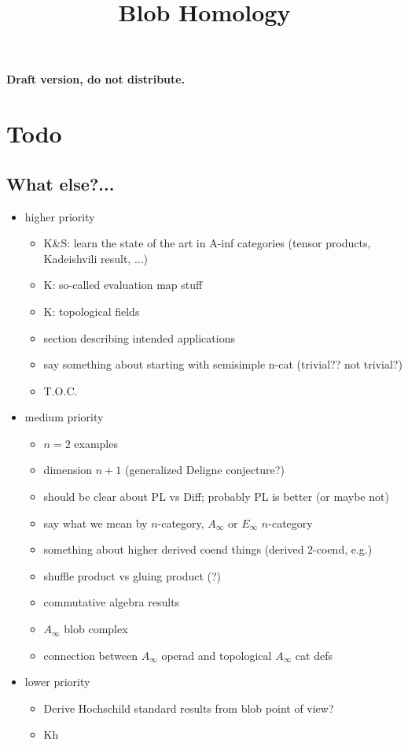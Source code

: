 \documentclass[11pt,leqno]{amsart}
\title{Blob Homology}
\begin{document}
\makeatletter
{}
\gdef\theequation{\thesection.\arabic{equation}}
\makeatother


\maketitle

\textbf{Draft version, do not distribute.}

\versioninfo

\section*{Todo}

\subsection*{What else?...}

\begin{itemize}
\item higher priority
\begin{itemize}
\item K\&S: learn the state of the art in A-inf categories
(tensor products, Kadeishvili result, ...)
\item K: so-called evaluation map stuff
\item K: topological fields
\item section describing intended applications
\item say something about starting with semisimple n-cat (trivial?? not trivial?)
\item T.O.C.
\end{itemize}
\item medium priority
\begin{itemize}
\item $n=2$ examples
\item dimension $n+1$ (generalized Deligne conjecture?)
\item should be clear about PL vs Diff; probably PL is better
(or maybe not)
\item say what we mean by $n$-category, $A_\infty$ or $E_\infty$ $n$-category
\item something about higher derived coend things (derived 2-coend, e.g.)
\item shuffle product vs gluing product (?)
\item commutative algebra results
\item $A_\infty$ blob complex
\item connection between $A_\infty$ operad and topological $A_\infty$ cat defs
\end{itemize}
\item lower priority
\begin{itemize}
\item Derive Hochschild standard results from blob point of view?
\item Kh
\end{itemize}
\end{itemize}
\end{document}

